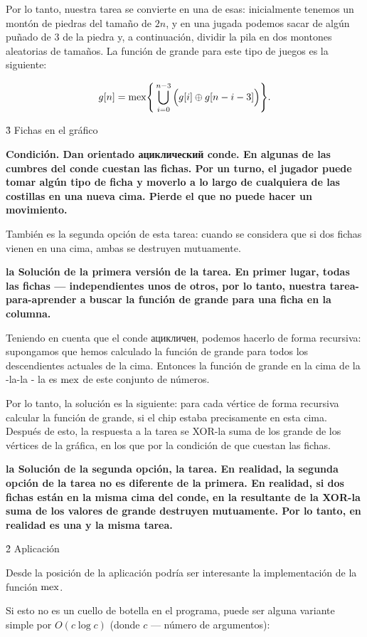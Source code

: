 Por lo tanto, nuestra tarea se convierte en una de esas: inicialmente tenemos un montón de piedras del tamaño de $2n$, y en una jugada podemos sacar de algún puñado de $3$ de la piedra y, a continuación, dividir la pila en dos montones aleatorias de tamaños. La función de grande para este tipo de juegos es la siguiente:

$$ g[n] = {\rm mex} \Bigg\{ \bigcup_{i=0}^{n-3} \Big( g[i] \oplus g[n-i-3] \Big) \Bigg\}. $$


\h3{ Fichas en el gráfico }

\bf{Condición}. Dan orientado ациклический conde. En algunas de las cumbres del conde cuestan las fichas. Por un turno, el jugador puede tomar algún tipo de ficha y moverlo a lo largo de cualquiera de las costillas en una nueva cima. Pierde el que no puede hacer un movimiento.

También es la segunda opción de esta tarea: cuando se considera que si dos fichas vienen en una cima, ambas se destruyen mutuamente.

\bf{la Solución de la primera versión de la tarea}. En primer lugar, todas las fichas --- independientes unos de otros, por lo tanto, nuestra tarea-para-aprender a buscar la función de grande para una ficha en la columna.

Teniendo en cuenta que el conde ацикличен, podemos hacerlo de forma recursiva: supongamos que hemos calculado la función de grande para todos los descendientes actuales de la cima. Entonces la función de grande en la cima de la -la-la - la es $\rm mex$ de este conjunto de números.

Por lo tanto, la solución es la siguiente: para cada vértice de forma recursiva calcular la función de grande, si el chip estaba precisamente en esta cima. Después de esto, la respuesta a la tarea se XOR-la suma de los grande de los vértices de la gráfica, en los que por la condición de que cuestan las fichas.

\bf{la Solución de la segunda opción, la tarea}. En realidad, la segunda opción de la tarea no es diferente de la primera. En realidad, si dos fichas están en la misma cima del conde, en la resultante de la XOR-la suma de los valores de grande destruyen mutuamente. Por lo tanto, en realidad es una y la misma tarea.


\h2{ Aplicación }

Desde la posición de la aplicación podría ser interesante la implementación de la función $\rm mex$.

Si esto no es un cuello de botella en el programa, puede ser alguna variante simple por $O (c \log c)$ (donde $c$ --- número de argumentos):

